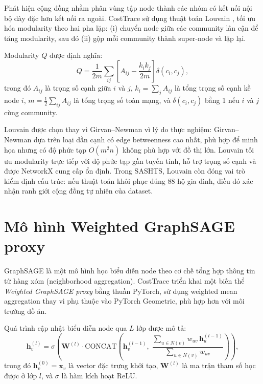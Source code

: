 \documentclass[12pt,a4paper]{report}
\theoremstyle{definition}
\begin{document}
Phát hiện cộng đồng nhằm phân vùng tập node thành các nhóm có kết nối nội bộ dày đặc hơn kết nối ra ngoài. CostTrace sử dụng thuật toán Louvain \cite{louvain2008}, tối ưu hóa modularity theo hai pha lặp: (i) chuyển node giữa các community lân cận để tăng modularity, sau đó (ii) gộp mỗi community thành super-node và lặp lại.

Modularity $Q$ được định nghĩa:
\begin{equation}
  Q = \frac{1}{2m} \sum_{ij} \left[ A_{ij} - \frac{k_i k_j}{2m} \right] \delta(c_i, c_j),
  \label{eq:modularity}
\end{equation}
trong đó $A_{ij}$ là trọng số cạnh giữa $i$ và $j$, $k_i = \sum_j A_{ij}$ là tổng trọng số cạnh kề node $i$, $m = \frac{1}{2}\sum_{ij} A_{ij}$ là tổng trọng số toàn mạng, và $\delta(c_i, c_j)$ bằng 1 nếu $i$ và $j$ cùng community.

Louvain được chọn thay vì Girvan--Newman \cite{girvanNewman2002} vì lý do thực nghiệm: Girvan--Newman dựa trên loại dần cạnh có edge betweenness cao nhất, phù hợp để minh họa nhưng có độ phức tạp $O(m^2 n)$ không phù hợp với đồ thị lớn. Louvain tối ưu modularity trực tiếp với độ phức tạp gần tuyến tính, hỗ trợ trọng số cạnh và được NetworkX cung cấp ổn định. Trong SASHTS, Louvain còn đóng vai trò kiểm định cấu trúc: nếu thuật toán khôi phục đúng 88 hộ gia đình, điều đó xác nhận ranh giới cộng đồng tự nhiên của dataset.

\section{Mô hình Weighted GraphSAGE proxy}

GraphSAGE \cite{graphsage2017} là một mô hình học biểu diễn node theo cơ chế tổng hợp thông tin từ hàng xóm (neighborhood aggregation). CostTrace triển khai một biến thể \textit{Weighted GraphSAGE proxy} bằng thuần PyTorch, sử dụng weighted mean aggregation thay vì phụ thuộc vào PyTorch Geometric, phù hợp hơn với môi trường đồ án.

Quá trình cập nhật biểu diễn node qua $L$ lớp được mô tả:
\begin{equation}
  \mathbf{h}_v^{(l)} = \sigma\!\left( \mathbf{W}^{(l)} \cdot \text{CONCAT}\!\left( \mathbf{h}_v^{(l-1)},\; \frac{\sum_{u \in N(v)} w_{uv}\, \mathbf{h}_u^{(l-1)}}{\sum_{u \in N(v)} w_{uv}} \right) \right),
  \label{eq:graphsage}
\end{equation}
trong đó $\mathbf{h}_v^{(0)} = \mathbf{x}_v$ là vector đặc trưng khởi tạo, $\mathbf{W}^{(l)}$ là ma trận tham số học được ở lớp $l$, và $\sigma$ là hàm kích hoạt ReLU.
\end{document}
